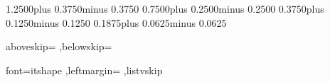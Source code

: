 


\frenchspacing

\newlength{\hugeskipamount}
\setlength{\hugeskipamount}  {1.2500\baselineskip plus 0.3750\baselineskip minus 0.3750\baselineskip}
\setlength{\bigskipamount}   {0.7500\baselineskip plus 0.2500\baselineskip minus 0.2500\baselineskip}
\setlength{\medskipamount}   {0.3750\baselineskip plus 0.1250\baselineskip minus 0.1250\baselineskip}
\setlength{\smallskipamount} {0.1875\baselineskip plus 0.0625\baselineskip minus 0.0625\baselineskip}







\renewcommand{\MathparLineskip}{
  \setlength{\lineskiplimit}{\bigskipamount}
  \setlength{\lineskip}{\bigskipamount}
}



\setlength{\abovecaptionskip}{\medskipamount}
\setlength{\floatsep}        {\medskipamount}
\setlength{\textfloatsep}    {\bigskipamount}
\setlength{\intextsep}       {\medskipamount}
\setlength{\dblfloatsep}     {\medskipamount}
\setlength{\dbltextfloatsep} {\bigskipamount}



\setlength{\pltopsep}   {\medskipamount}
\setlength{\plpartopsep}{\parskip}
\setlength{\plitemsep}  {\parskip}
\setlength{\plparsep}   {\parskip}



\lstset
  {aboveskip=\smallskipamount
  ,belowskip=\smallskipamount
  }






\quotingsetup
  {font=itshape
  ,leftmargin=\parindent
  ,listvskip}



